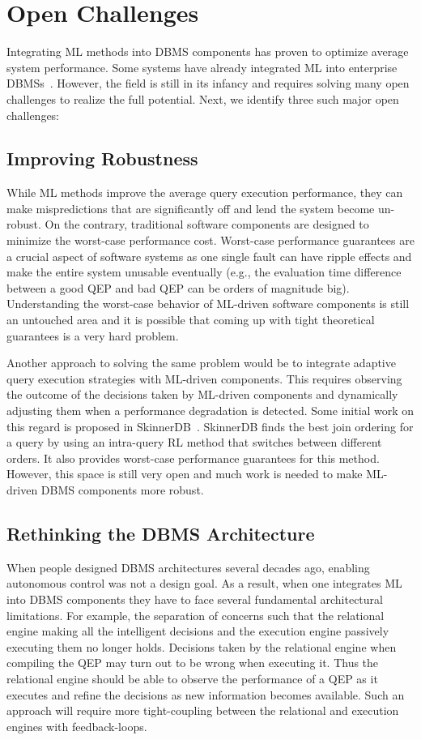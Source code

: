 \section{Open Challenges}
Integrating ML methods into DBMS components has proven to optimize average system performance.
Some systems have already integrated ML into enterprise DBMSs~\cite{leo, cardlearner, verdict}.
However, the field is still in its infancy and requires solving many open challenges to realize the full potential.
Next, we identify three such major open challenges:


\subsection{Improving Robustness} While ML methods improve the average query execution performance, they can make mispredictions that are significantly off and lend the system become un-robust.
On the contrary, traditional software components are designed to minimize the worst-case performance cost.
Worst-case performance guarantees are a crucial aspect of software systems as one single fault can have ripple effects and make the entire system unusable eventually (e.g., the evaluation time difference between a good QEP and bad QEP can be orders of magnitude big).
Understanding the worst-case behavior of ML-driven software components is still an untouched area and it is possible that coming up with tight theoretical guarantees is a very hard problem.
 
Another approach to solving the same problem would be to integrate adaptive query execution strategies with ML-driven components.
This requires observing the outcome of the decisions taken by ML-driven components and dynamically adjusting them when a performance degradation is detected.
Some initial work on this regard is proposed in SkinnerDB~\cite{skinnerdb}.
SkinnerDB finds the best join ordering for a query by using an intra-query RL method that switches between different orders.
It also provides worst-case performance guarantees for this method.
However, this space is still very open and much work is needed to make ML-driven DBMS components more robust.


\subsection{Rethinking the DBMS Architecture} When people designed DBMS architectures several decades ago, enabling autonomous control was not a design goal.
As a result, when one integrates ML into DBMS components they have to face several fundamental architectural limitations.
For example, the separation of concerns such that the relational engine making all the intelligent decisions and the execution engine passively executing them no longer holds.
Decisions taken by the relational engine when compiling the QEP may turn out to be wrong when executing it.
Thus the relational engine should be able to observe the performance of a QEP as it executes and refine the decisions as new information becomes available.
Such an approach will require more tight-coupling between the relational and execution engines with feedback-loops.

